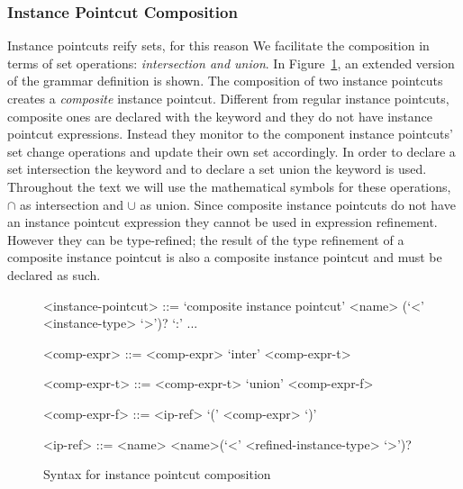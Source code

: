 \subsubsection{Instance Pointcut Composition}
\label{sect:compo}

Instance pointcuts reify sets, for this reason We facilitate the composition in terms of set operations: \emph{intersection and union}. 
In Figure~\ref{fig:grammar2}, an extended version of the grammar definition is shown. 
The composition of two instance pointcuts creates a \emph{composite} instance pointcut. Different from regular instance pointcuts, composite ones are declared with the keyword  and they do not have instance pointcut expressions. Instead they monitor to the component instance pointcuts' set change operations and update their own set accordingly. 
In order to declare a set intersection the keyword  and to declare a set union the keyword  is used. Throughout the text we will use the mathematical symbols for these operations, $\cap$ as intersection and $\cup$ as union. Since composite instance pointcuts do not have an instance pointcut expression they cannot be used in expression refinement. However they can be type-refined; the result of the type refinement of a composite instance pointcut is also a composite instance pointcut and must be declared as such. 

\begin{figure}[h]
\begin{grammar}
<instance-pointcut> ::= `composite instance pointcut' <name> (`<' <instance-type> `>')? `:'
... 

<comp-expr> ::= <comp-expr> `inter' <comp-expr-t>  

<comp-expr-t> ::= <comp-expr-t> `union' <comp-expr-f>  

<comp-expr-f> ::= <ip-ref> \alt `(' <comp-expr> `)'

<ip-ref> ::= <name> \alt <name>(`<' <refined-instance-type> `>')?

\end{grammar}
\caption{Syntax for instance pointcut composition}
\label{fig:grammar2}
\end{figure}


